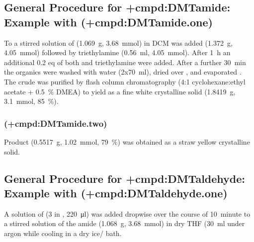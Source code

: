 {%

\subsection{General Procedure for \cmpd+{cmpd:DMTamide}: Example with  (\cmpd+{cmpd:DMTamide.one})}

To a stirred solution of  (\SI{1.069}{\gram}, \SI{3.68}{\milli\mol}) in DCM was added  (\SI{1.372}{\gram}, \SI{4.05}{\milli\mol}) followed by triethylamine (\SI{0.56}{\milli\litre}, \SI{4.05}{\milli\mol}). After \SI{1}{\hour} an additional 0.2 eq of both  and triethylamine were added. After a further \SI{30}{\minute} the organics were washed with water (2x\SI{70}{\milli\litre}), dried over , and evaporated \invacuo. The crude was purified by flash column chromatography (4:1 cyclohexane:ethyl acetate + \SI{0.5}{\percent} DMEA) to yield  as a fine white crystalline solid (\SI{1.8419}{\gram}, \SI{3.1}{\milli\mol}, \SI{85}{\percent}).

    \subsubsection{ (\cmpd+{cmpd:DMTamide.two})}
    Product  (\SI{0.5517}{\gram}, \SI{1.02}{\milli\mol}, \SI{79}{\percent}) was obtained as a straw yellow crystalline solid.


\subsection{General Procedure for \cmpd+{cmpd:DMTaldehyde}: Example with  (\cmpd+{cmpd:DMTaldehyde.one})}

A solution of  (\SI{3}{\Molar} in , \SI{220}{\micro\litre}) was added dropwise over the course of \SI{10}{minute} to a stirred solution of the amide  (\SI{1.068}{\gram}, \SI{3.68}{\milli\mol}) in dry THF (\SI{30}{\milli\litre} under argon while cooling in a dry ice/ bath.

}
